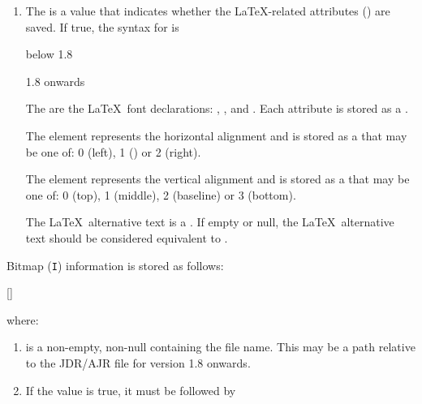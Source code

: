 \begin{numbered}
\begin{enumerate}
  \item\label{jdr:latexspecs} The  is a  value that indicates
  whether the \LaTeX-related attributes () are saved.
  If true, the syntax for  is
  \begin{jdrversion}{below 1.8}
  \begin{syntaxline}
     
  \end{syntaxline}
  \end{jdrversion}
  \begin{jdrversion}{1.8 onwards}
  \begin{syntaxline}
     
   
  \end{syntaxline}
  \end{jdrversion}
  The  are the \LaTeX\ font declarations: ,
  ,  and . Each attribute is
  stored as a .

  The  element represents the horizontal alignment and
  is stored as a  that may be one of: 0 (left), 1
  () or 2 (right).

  The  element represents the vertical alignment and
  is stored as a  that may be one of: 0 (top), 1
  (middle), 2 (baseline) or 3 (bottom).

  The \LaTeX\ alternative text  is a .
  If empty or null, the \LaTeX\ alternative text should be considered equivalent
  to .
  \end{enumerate}%

\item\label{jdr:bitmap} Bitmap (\texttt{I}) information is stored as follows:
\begin{syntaxline}
  []
\end{syntaxline}
where:
  \begin{enumerate}
  \item {} is a non-empty, non-null 
  containing the file name. This may be a path relative to the
  \gls{JDR}\slash\gls{AJR} file for version 1.8 onwards.

  \item If the  value  is true, it must
  be followed by 


\end{enumerate}
\end{numbered}
